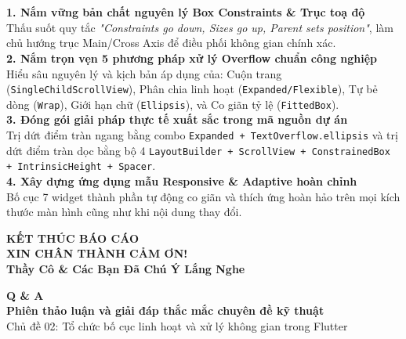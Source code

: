 \documentclass[aspectratio=169, 10pt]{beamer}
\newcommand{\SlideHeader}[2]{%
  \noindent{\textcolor{AccentOrange}{\textbf{\footnotesize #1}}}\\[0.08cm]
  \noindent{\Large \textbf{\textcolor{NavyTitle}{#2}}}\\[0.22cm]
}
\begin{document}
\begin{frame}
  \SlideHeader{TỔNG KẾT ĐỀ TÀI}{4 Trụ Cột Bố Cục Cốt Lõi Đã Đạt Được}

  \textbf{1. Nắm vững bản chất nguyên lý Box Constraints \& Trục toạ độ}\\
  {\small Thấu suốt quy tắc \textit{"Constraints go down, Sizes go up, Parent sets position"}, làm chủ hướng trục Main/Cross Axis để điều phối không gian chính xác.}\\[0.22cm]

  \textbf{2. Nắm trọn vẹn 5 phương pháp xử lý Overflow chuẩn công nghiệp}\\
  {\small Hiểu sâu nguyên lý và kịch bản áp dụng của: Cuộn trang (\texttt{SingleChildScrollView}), Phân chia linh hoạt (\texttt{Expanded/Flexible}), Tự bẻ dòng (\texttt{Wrap}), Giới hạn chữ (\texttt{Ellipsis}), và Co giãn tỷ lệ (\texttt{FittedBox}).}\\[0.22cm]

  \textbf{3. Đóng gói giải pháp thực tế xuất sắc trong mã nguồn dự án}\\
  {\small Trị dứt điểm tràn ngang bằng combo \texttt{Expanded + TextOverflow.ellipsis} và trị dứt điểm tràn dọc bằng bộ 4 \texttt{LayoutBuilder + ScrollView + ConstrainedBox + IntrinsicHeight + Spacer}}.\\[0.22cm]

  \textbf{4. Xây dựng ứng dụng mẫu Responsive \& Adaptive hoàn chỉnh}\\
  {\small Bố cục 7 widget thành phần tự động co giãn và thích ứng hoàn hảo trên mọi kích thước màn hình cũng như khi nội dung thay đổi.}
\end{frame}

\begin{frame}
  \vspace{0.7cm}
  \centering
  {\textcolor{AccentOrange}{\textbf{\footnotesize KẾT THÚC BÁO CÁO}}}\\[0.35cm]
  {\Huge \textbf{\textcolor{NavyTitle}{XIN CHÂN THÀNH CẢM ƠN!}}}\\[0.25cm]
  {\Large \textbf{\textcolor{TextDark}{Thầy Cô \& Các Bạn Đã Chú Ý Lắng Nghe}}}\\[0.5cm]

  \begin{tcolorbox}[colback=CardBg, colframe=NavyHeader!40, width=8.5cm, arc=8pt, boxrule=1.1pt, halign=center, top=8pt, bottom=8pt]
    {\Huge \textbf{\textcolor{NavyTitle}{Q \& A}}}\\[0.15cm]
    {\small \textbf{Phiên thảo luận và giải đáp thắc mắc chuyên đề kỹ thuật}}\\[0.1cm]
    {\footnotesize Chủ đề 02: Tổ chức bố cục linh hoạt và xử lý không gian trong Flutter}
  \end{tcolorbox}
\end{frame}
\end{document}

